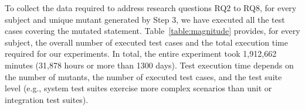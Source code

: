 



%



{To collect the data required to address research questions RQ2 to RQ8, for every subject and unique mutant generated by Step 3, we have executed all the test cases covering the mutated statement. Table~\ref{table:magnitude} provides, for every subject, the overall number of executed test cases and the total execution time required for our experiments. In total, the entire experiment took 1,912,662 minutes (31,878 hours or more than 1300 days). Test  execution time depends on the number of mutants, the number of executed test cases, and the test suite level (e.g., system test suites exercise more complex scenarios than unit or integration test suites).}




